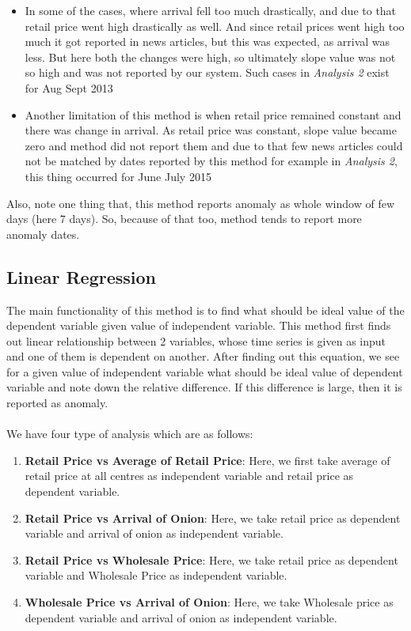 \documentclass[a4paper,10pt]{report}
\begin{document}
\begin{itemize}
			\item In some of the cases, where arrival fell too much drastically, and due to that retail price went high drastically as well. And since retail prices went high too much it got reported in news articles, but this was expected, as arrival was less. But here both the changes were high, so ultimately slope value was not so high and was not reported by our system. Such cases in \textit{Analysis 2} exist for Aug Sept 2013
			
			\item Another limitation of this method is when retail price remained constant and there was change in arrival. As retail price was constant, slope value became zero and method did not report them and due to that few news articles could not be matched by dates reported by this method for example in \textit{Analysis 2}, this thing occurred for June July 2015
			
		\end{itemize}


	Also, note one thing that, this method reports anomaly as whole window of few days (here 7 days). So, because of that too, method tends to report more anomaly dates.


\subsection{Linear Regression}

		The main functionality of this method is to find what should be ideal value of the dependent variable given value of independent variable. This method first finds out linear relationship between 2 variables, whose time series is given as input and one of them is dependent on another. After finding out this equation, we see for a given value of independent variable what should be ideal value of dependent variable and note down the relative difference. If this difference is large, then it is reported as anomaly.\\
		\\
		We have four type of analysis which are as follows:
		\begin{enumerate}
			\item \textbf{Retail Price vs Average of Retail Price}: Here, we first take average of retail price at all centres as independent variable and retail price as dependent variable.			
			\item \textbf{Retail Price vs Arrival of Onion}: Here, we take retail price as dependent variable and arrival of onion as independent variable.
			\item \textbf{Retail Price vs Wholesale Price}: Here, we take retail price as dependent variable and Wholesale Price as independent variable.
			\item \textbf{Wholesale Price vs Arrival of Onion}: Here, we take Wholesale price as dependent variable and arrival of onion as independent variable.
		\end{enumerate}
		
\end{document}
